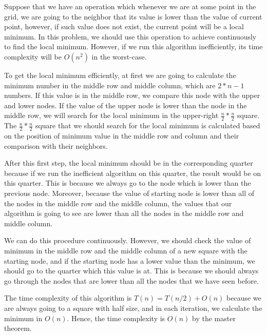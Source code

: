 \documentclass[12pt]{article}
\newenvironment{solution}[2][Solution]{\begin{trivlist}
\item[\hskip \labelsep {\bfseries #1}]}{\end{trivlist}}
\begin{document}
\begin{solution}{}
Suppose that we have an operation which whenever we are at some point in the grid,
we are going to the neighbor that its value is lower than the value of current point,
however, if such value does not exist, the current point will be a local minimum.
In this problem, we should use this operation to achieve continuously to find the
local minimum. However, if we run this algorithm inefficiently, its time complexity
will be $O(n^2)$ in the worst-case.

To get the local minimum efficiently, at first we are going to calculate the
minimum number in the middle row and middle column, which are $2*n-1$ numbers. If this value
is in the middle row, we compare this node with the upper and lower nodes. If the value of
the upper node is lower than the node in the middle row, we will search for the local minimum
in the upper-right $\frac{n}{2} * \frac{n}{2}$ square. The $\frac{n}{2} * \frac{n}{2}$ square 
that we should search for the local minimum is calculated based on the position of minimum
value in the middle row and column and their comparison with their neighbors.

After this first step, the local minimum should be in the corresponding quarter because
if we run the inefficient algorithm on this quarter, the result would be on this quarter.
This is because we always go to the node which is lower than the previous node. Moreover, 
because the value of starting node is lower than all of the nodes in the middle row and
the middle column, the values that our algorithm is going to see are lower than all
the nodes in the middle row and middle column.

We can do this procedure continuously. However, we should check the value of minimum in
the middle row and the middle column of a new square with the starting node, and if the
starting node has a lower value than the minimum, we should go to the quarter which this
value is at. This is because we should always go through the nodes that are lower than 
all the nodes that we have seen before.

The time complexity of this algorithm is $T(n) = T(n/2) + O(n)$ because we are always
going to a square with half size, and in each iteration, we calculate the minimum
in $O(n)$. Hence, the time complexity is $O(n)$ by the master theorem.
\end{solution}

\pagebreak
\end{document}
